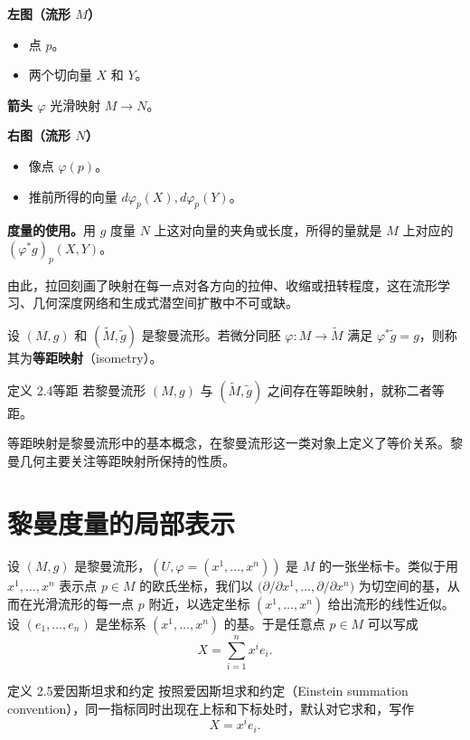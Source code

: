 \textbf{左图（流形 $M$）}
\begin{itemize}
  \item 点 $p$。
  \item 两个切向量 $X$ 和 $Y$。
\end{itemize}

\textbf{箭头 $\varphi$} \quad 光滑映射 $M\to N$。

\textbf{右图（流形 $N$）}
\begin{itemize}
  \item 像点 $\varphi(p)$。
  \item 推前所得的向量 $d\varphi_p(X),d\varphi_p(Y)$。
\end{itemize}

\textbf{度量的使用。}用 $g$ 度量 $N$ 上这对向量的夹角或长度，所得的量就是 $M$ 上对应的 $(\varphi^*g)_p(X,Y)$。

由此，拉回刻画了映射在每一点对各方向的拉伸、收缩或扭转程度，这在流形学习、几何深度网络和生成式潜空间扩散中不可或缺。

设 $(M,g)$ 和 $(\widetilde M,\widetilde g)$ 是黎曼流形。若微分同胚 $\varphi\colon M\to\widetilde M$ 满足 $\varphi^*\widetilde g=g$，则称其为\textbf{等距映射}（isometry）。

\begin{statement}{定义 2.4}{等距}
若黎曼流形 $(M,g)$ 与 $(\widetilde M,\widetilde g)$ 之间存在等距映射，就称二者等距。

等距映射是黎曼流形中的基本概念，在黎曼流形这一类对象上定义了等价关系。黎曼几何主要关注等距映射所保持的性质。
\end{statement}

\section{黎曼度量的局部表示}
设 $(M,g)$ 是黎曼流形，$(U,\varphi=(x^1,\ldots,x^n))$ 是 $M$ 的一张坐标卡。类似于用 $x^1,\ldots,x^n$ 表示点 $p\in M$ 的欧氏坐标，我们以
$\bigl(\partial/\partial x^1,\ldots,\partial/\partial x^n\bigr)$
为切空间的基，从而在光滑流形的每一点 $p$ 附近，以选定坐标 $(x^1,\ldots,x^n)$ 给出流形的线性近似。设 $(e_1,\ldots,e_n)$ 是坐标系 $(x^1,\ldots,x^n)$ 的基。于是任意点 $p\in M$ 可以写成
\begin{equation*}
  X=\sum_{i=1}^n x^i e_i.
  \tag{2.1}\label{eq:2.1}
\end{equation*}

\begin{statement}{定义 2.5}{爱因斯坦求和约定}
按照爱因斯坦求和约定（Einstein summation convention），同一指标同时出现在上标和下标处时，默认对它求和，写作
\begin{equation*}
  X=x^i e_i.
  \tag{2.2}\label{eq:2.2}
\end{equation*}
\end{statement}

